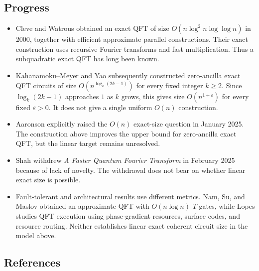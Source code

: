 \subsection*{Progress}

\begin{itemize}
  \item Cleve and Watrous obtained an exact QFT of size $O(n\log^2 n\log\log n)$ in 2000, together with efficient approximate parallel constructions. Their exact construction uses recursive Fourier transforms and fast multiplication. Thus a subquadratic exact QFT has long been known. 

  \item Kahanamoku--Meyer and Yao subsequently constructed zero-ancilla exact QFT circuits of size $O\!\left(n^{\log_k(2k-1)}\right)$ for every fixed integer $k\geq2$. Since $\log_k(2k-1)$ approaches $1$ as $k$ grows, this gives size $O(n^{1+\varepsilon})$ for every fixed $\varepsilon>0$. It does not give a single uniform $O(n)$ construction. 

  \item Aaronson explicitly raised the $O(n)$ exact-size question in January 2025. The construction above improves the upper bound for zero-ancilla exact QFT, but the linear target remains unresolved. 

  \item Shah withdrew \emph{A Faster Quantum Fourier Transform} in February 2025 because of lack of novelty. The withdrawal does not bear on whether linear exact size is possible. 

  \item Fault-tolerant and architectural results use different metrics. Nam, Su, and Maslov obtained an approximate QFT with $O(n\log n)$ $T$ gates, while Lopes studies QFT execution using phase-gradient resources, surface codes, and resource routing. Neither establishes linear exact coherent circuit size in the model above. 
\end{itemize}

\subsection*{References}

